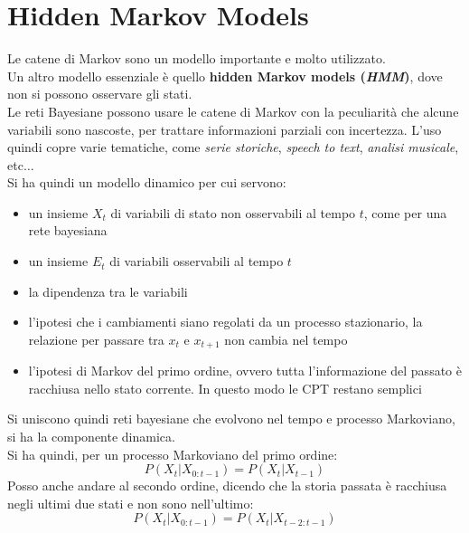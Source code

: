\documentclass[a4paper,12pt, oneside]{book}
\begin{document}
\section{Hidden Markov Models}
Le catene di Markov sono un modello importante e molto utilizzato.\\
Un altro modello essenziale è quello \textbf{hidden Markov models
  (\textit{HMM})}, dove non si possono osservare gli stati.\\
Le reti Bayesiane possono usare le catene di Markov con la peculiarità che
alcune variabili sono nascoste, per trattare informazioni parziali con
incertezza. L'uso quindi copre varie tematiche, come \textit{serie storiche},
\textit{speech to text}, \textit{analisi musicale}, etc$\ldots$ \\
Si ha quindi un modello dinamico per cui servono:
\begin{itemize}
  \item un insieme $X_t$ di variabili di stato non osservabili al tempo $t$,
  come per una rete bayesiana
  \item un insieme $E_t$ di variabili osservabili al tempo $t$
  \item la dipendenza tra le variabili
  \item l'ipotesi che i cambiamenti siano regolati da un processo stazionario,
  la relazione per passare tra $x_t$ e $x_{t+1}$ non cambia nel tempo
  \item l'ipotesi di Markov del primo ordine, ovvero tutta l'informazione del
  passato è racchiusa nello stato corrente. In questo modo le CPT restano
  semplici 
\end{itemize}
Si uniscono quindi reti bayesiane che evolvono nel tempo e processo
Markoviano, si ha la componente dinamica. \\
Si ha quindi, per un processo Markoviano del primo ordine:
\[P(X_t|X_{0:t-1})=P(X_t|X_{t-1})\]
Posso anche andare al secondo ordine, dicendo che la storia passata è racchiusa
negli ultimi due stati e non sono nell'ultimo:
\[P(X_t|X_{0:t-1})=P(X_t|X_{t-2:t-1})\]
\end{document}
